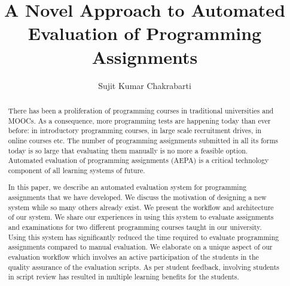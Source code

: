 \documentclass[sigconf]{acmart}
\begin{document}
\title{A Novel Approach to Automated Evaluation of Programming Assignments}

\author{Sujit Kumar Chakrabarti}



\begin{abstract}
There has been a proliferation of programming courses in traditional universities and MOOCs. As a consequence, more programming tests are happening today than ever before: in introductory programming courses, in large scale recruitment drives, in online courses etc. The number of programming assignments submitted in all its forms today is so large that evaluating them manually is no more a feasible option. Automated evaluation of programming assignments (AEPA) is a critical technology  component of all learning systems of future.

In this paper, we describe an automated evaluation system for programming assignments that we have developed. We discuss the motivation of designing a new system while so many others already exist. We present the workflow and architecture of our system. We share our experiences in using this system to evaluate assignments and examinations for two different programming courses taught in our university. Using this system has significantly reduced the time required to evaluate programming assignments compared to manual evaluation. We elaborate on a unique aspect of our evaluation workflow which involves an active participation of the students in the quality assurance of the evaluation scripts. As per student feedback, involving students in script review has resulted in multiple learning benefits for the students.
\end{abstract}

\maketitle
\end{document}
